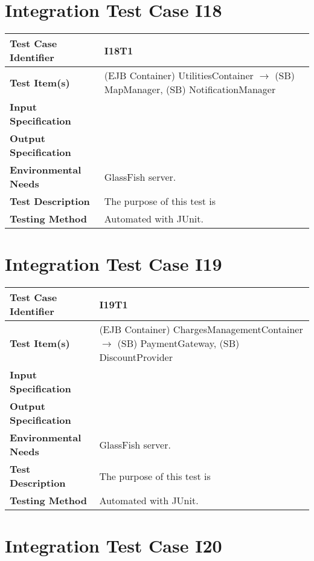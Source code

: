 \section{Integration Test Case I18}

\begin{longtable}{p{} | p{}}
\hline
\textbf{Test Case Identifier} & I18T1\\
\hline
\textbf{Test Item(s)} & (EJB Container) UtilitiesContainer $\rightarrow$ (SB) MapManager, (SB) NotificationManager \\
\hline
\textbf{Input Specification} &  \\
\hline
\textbf{Output Specification} &  \\
\hline
\textbf{Environmental Needs} & GlassFish server. \\
\hline
\textbf{Test Description} & The purpose of this test is  \\
\hline
\textbf{Testing Method} & Automated with JUnit. \\
\hline
\end{longtable}

\section{Integration Test Case I19}

\begin{longtable}{p{} | p{}}
\hline
\textbf{Test Case Identifier} & I19T1\\
\hline
\textbf{Test Item(s)} & (EJB Container) ChargesManagementContainer $\rightarrow$ (SB) PaymentGateway, (SB) DiscountProvider \\
\hline
\textbf{Input Specification} &  \\
\hline
\textbf{Output Specification} &  \\
\hline
\textbf{Environmental Needs} & GlassFish server. \\
\hline
\textbf{Test Description} & The purpose of this test is  \\
\hline
\textbf{Testing Method} & Automated with JUnit. \\
\hline
\end{longtable}

\section{Integration Test Case I20}

